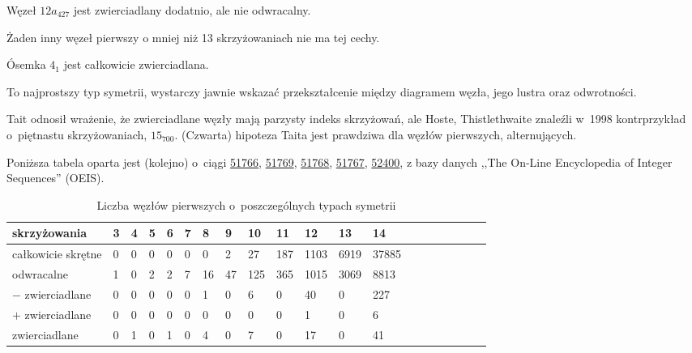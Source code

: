 \begin{example}
    Węzeł $12a_{427}$ jest zwierciadlany dodatnio, ale nie odwracalny.
\end{example}

Żaden inny węzeł pierwszy o mniej niż 13 skrzyżowaniach nie ma tej cechy.

\begin{example}
\label{property_of_eight_knot}%
    Ósemka $4_1$ jest całkowicie zwierciadlana.
\end{example}

To najprostszy typ symetrii, wystarczy jawnie wskazać przekształcenie między diagramem węzła, jego lustra oraz odwrotności.

\label{con:tait_fourth}%
Tait odnosił wrażenie, że zwierciadlane węzły mają parzysty indeks skrzyżowań, ale Hoste, Thistlethwaite znaleźli w~1998 kontrprzykład o~piętnastu skrzyżowaniach, $15_{700}$. %
(Czwarta) hipoteza Taita jest prawdziwa dla węzłów pierwszych, alternujących.
%

Poniższa tabela oparta jest (kolejno) o~ciągi
\href{https://oeis.org/A051766}{51766},
\href{https://oeis.org/A051769}{51769},
\href{https://oeis.org/A051768}{51768},
\href{https://oeis.org/A051767}{51767},
\href{https://oeis.org/A052400}{52400},
z bazy danych ,,The On-Line Encyclopedia of Integer Sequences'' (OEIS).

\begin{table}[h]
    \centering
    \begin{tabular}{@{}*{20}l@{}} \toprule
        skrzyżowania & 3 & 4 & 5 & 6 & 7 & 8 & 9 & 10 & 11 & 12 & 13 & 14 \\ \midrule
        całkowicie skrętne & 0 & 0 & 0 & 0 & 0 & 0 & 2 & 27 & 187 & 1103 & 6919 & 37885 \\
        odwracalne & 1 & 0 & 2 & 2 & 7 & 16 & 47 & 125 & 365 & 1015 & 3069 & 8813 \\
        $-$ zwierciadlane & 0 & 0 & 0 & 0 & 0 & 1 & 0 & 6 & 0 & 40 & 0 & 227 \\
        $+$ zwierciadlane & 0 & 0 & 0 & 0 & 0 & 0 & 0 & 0 & 0 & 1 & 0 & 6 \\
        zwierciadlane & 0 & 1 & 0 & 1 & 0 & 4 & 0 & 7 & 0 & 17 & 0 & 41 \\
        \bottomrule
        \hline
    \end{tabular}
    \caption{Liczba węzłów pierwszych o~poszczególnych typach symetrii}
\end{table}

